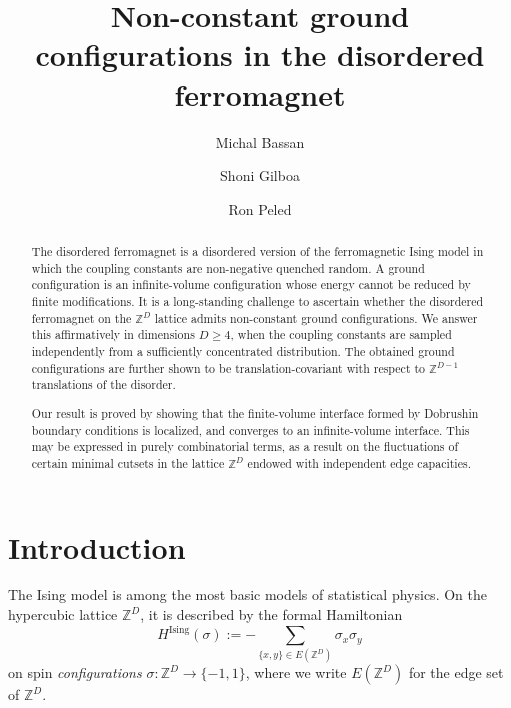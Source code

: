 \documentclass[11pt, reqno]{amsart}
\newcommand{\Z}{\mathbb{Z}}
\numberwithin{equation}{section}
\begin{document}
\title{Non-constant ground configurations in the disordered ferromagnet}

\author[M. Bassan]{Michal Bassan}
\address[M. Bassan]{School of Mathematical Sciences, Tel Aviv University, Tel Aviv, Israel}

\author[S. Gilboa]{Shoni Gilboa}
\address[S. Gilboa]{Department of Mathematics, The Open University of Israel, Raanana, Israel}

\author[R. Peled]{Ron Peled}
\address[R. Peled]{School of Mathematical Sciences, Tel Aviv University, Tel Aviv, Israel.\hfill\break
School of Mathematics, Institute for Advanced Study and Department of Mathematics, Princeton University, New Jersey, United States}

\maketitle

\begin{abstract}
The disordered ferromagnet is a disordered version of the ferromagnetic Ising model in which the coupling constants are non-negative quenched random. A ground configuration is an infinite-volume configuration whose energy cannot be reduced by finite modifications. It is a long-standing challenge to ascertain whether the disordered ferromagnet on the $\Z^D$ lattice admits non-constant ground configurations. We answer this affirmatively in dimensions $D\ge 4$, when the coupling constants are sampled independently from a sufficiently concentrated distribution. The obtained ground configurations are further shown to be translation-covariant with respect to $\Z^{D-1}$ translations of the disorder.

Our result is proved by showing that the finite-volume interface formed by Dobrushin boundary conditions is localized, and converges to an infinite-volume interface. This may be expressed in purely combinatorial terms, as a result on the fluctuations of certain minimal cutsets in the lattice $\Z^D$ endowed with independent edge capacities.
\end{abstract}

\section{Introduction}

The Ising model is among the most basic models of statistical physics. On the hypercubic lattice $\Z^D$, it is described by the formal Hamiltonian
\begin{equation}
H^{\text{Ising}}(\sigma):=-\sum_{\{x,y\}\in E(\Z^D)}\sigma_x\sigma_y
\end{equation}
on spin \emph{configurations} $\sigma\colon \Z^D\to\{-1,1\}$, where we write $E(\Z^D)$ for the edge set of $\Z^D$.
\end{document}
